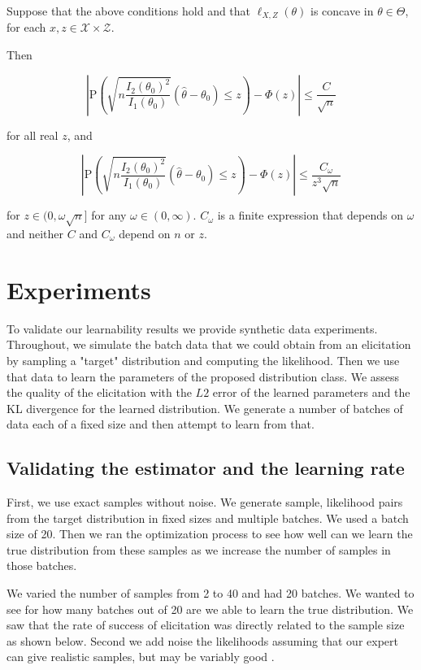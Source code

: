 Suppose that the above conditions hold and that $\ell_{X,Z}(\theta)$ is concave in $\theta\in \Theta$, for each $x,z\in \mathcal{X}\times \mathcal{Z}$. 


Then

$$|\mathrm{P}\left(\sqrt{n \frac{I_2(\theta_{0})^2}{I_1(\theta_0)}}(\hat{\theta}-\theta_{0})\leq z\right)-\Phi(z)|\leq\frac{C}{\sqrt{n}}$$

for all real $z$, and

$$|\mathrm{P}(\sqrt{n\frac{I_2(\theta_{0})^2}{I_1(\theta_0)}}(\hat{\theta}-\theta_{0})\leq z)-\Phi(z)|\leq\frac{C_{\omega}}{z^3 \sqrt{n}}$$

for $z\in (0,\omega \sqrt{n}]$ for any $\omega\in (0,\infty)$. $C_{\omega}$ is a finite expression that depends on $\omega$ and neither $C$ and $C_{\omega}$ depend on $n$ or $z$.

\section{Experiments}

To validate our learnability results we provide synthetic data experiments.
Throughout, we simulate the batch data that we could obtain from an elicitation by sampling a "target" distribution and computing the likelihood.
Then we use that data to learn the parameters of the proposed distribution class.
We assess the quality of the elicitation with the $L2$ error of the learned parameters and the KL divergence for the learned distribution. 
We generate a number of batches of data each of a fixed size and then attempt to learn from that.  

\subsection{Validating the estimator and the learning rate}

First, we use exact samples without noise. We generate sample, likelihood pairs from the target distribution in fixed sizes and multiple batches. We used a batch size of 20. Then we ran the optimization process to see how well can we learn the true distribution from these samples as we increase the number of samples in those batches. 

We varied the number of samples from 2 to 40 and had 20 batches. We wanted to see for how many batches out of 20 are we able to learn the true distribution. We saw that the rate of success of elicitation was directly related to the sample size as shown below.
Second we add noise the likelihoods assuming that our expert can give realistic samples, but may be variably good .

